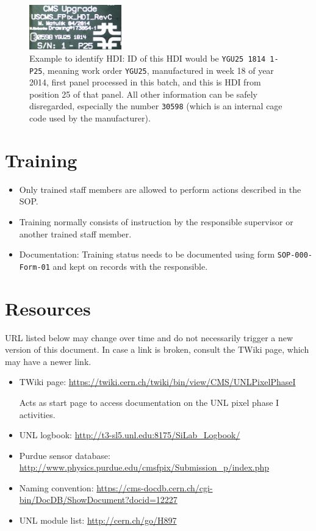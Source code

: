 \documentclass[12pt]{unlsilabsop}
\begin{document}
\begin{figure}[hH]
    \begin{center}
        \includegraphics[width=4cm]{img/HDI_SN.jpg}
        \caption{Example to identify HDI: ID of this HDI would be \texttt{YGU25 1814 1-P25}, meaning work order \texttt{YGU25}, manufactured in week 18 of year 2014, first panel processed in this batch, and this is HDI from position 25 of that panel. All other information can be safely disregarded, especially the number \texttt{30598} (which is an internal cage code used by the manufacturer).}
        \label{fig:HDI_SN}
    \end{center}
\end{figure}

\section{Training}
\begin{itemize}
\item Only trained staff members are allowed to perform actions described in the SOP.
\item Training normally consists of instruction by the responsible supervisor or another trained staff member.
\item Documentation: Training status needs to be documented using form \texttt{SOP-000-Form-01} and kept on records with the responsible.
\end{itemize}

\section{Resources} \label{sec:resources}
URL listed below may change over time and do not necessarily trigger a new version of this document. In case a link is broken, consult the TWiki page, which may have a newer link.
\begin{itemize}
    \item TWiki page: \url{https://twiki.cern.ch/twiki/bin/view/CMS/UNLPixelPhaseI}

    Acts as start page to access documentation on the UNL pixel phase I activities.
    \item UNL logbook: \url{http://t3-sl5.unl.edu:8175/SiLab_Logbook/}
    \item Purdue sensor database: \url{http://www.physics.purdue.edu/cmsfpix/Submission_p/index.php}
    \item Naming convention: \url{https://cms-docdb.cern.ch/cgi-bin/DocDB/ShowDocument?docid=12227}
    \item UNL module list: \url{http://cern.ch/go/H897}
\end{itemize}
\end{document}
